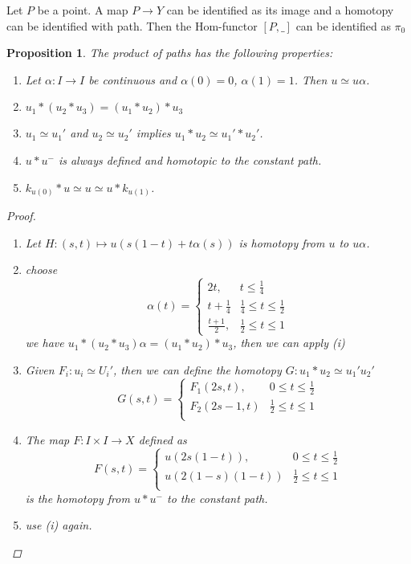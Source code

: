 \documentclass[11pt]{article}
\newtheorem{prop}[thm]{Proposition}
\newcommand{\lrta}{\longrightarrow}
\begin{document}
Let $P$ be a point. A map $P\lrta Y$ can be identified as its image and a homotopy can be identified with path. Then the Hom-functor $[P,\_]$ can be identified as $\pi_0$

\begin{prop}
The product of paths has the following properties:
\begin{enumerate}[label=(\roman*)]
\item Let $\alpha:I\lrta I$ be continuous and $\alpha(0)=0$, $\alpha(1)=1$. Then $u\simeq u\alpha$.
\item $u_1*(u_2*u_3)=(u_1*u_2)*u_3$
\item $u_1\simeq u_1'$ and $u_2\simeq u_2'$ implies $u_1*u_2\simeq u_1'*u_2'$.
\item $u*u^-$ is always defined and homotopic to the constant path.
\item $k_{u(0)}*u\simeq u\simeq u*k_{u(1)}$.
\end{enumerate}
\begin{proof}
\begin{enumerate}[label=(\roman*)]
\item Let $H:(s,t)\mapsto u(s(1-t)+t\alpha(s))$ is homotopy from $u$ to $u\alpha$.
\item choose 
$$
\alpha(t)=\left\{
\begin{matrix*}
2t, & t\leq \frac{1}{4}\\
t+\frac{1}{4} & \frac{1}{4}\leq t\leq \frac{1}{2}\\
\frac{t+1}{2}, & \frac{1}{2}\leq t\leq 1
\end{matrix*}
\right.
$$
we have $u_1*(u_2*u_3)\alpha=(u_1*u_2)*u_3$, then we can apply (i)
\item Given $F_i:u_i\simeq U_i'$, then we can define the homotopy $G:u_1*u_2\simeq u_1'u_2'$ 
$$
G(s,t)=\left\{
\begin{matrix*}
F_1(2s,t), & 0\leq t\leq \frac{1}{2}\\
F_2(2s-1,t) & \frac{1}{2}\leq t\leq 1\\
\end{matrix*}
\right.
$$
\item The map $F: I \times  I \lrta X$ defined as 
$$
F(s,t)=\left\{
\begin{matrix*}
u(2s(1-t)), & 0\leq t\leq \frac{1}{2}\\
u(2(1-s)(1-t)) & \frac{1}{2}\leq t\leq 1\\
\end{matrix*}
\right.
$$
is the homotopy from $u*u^-$ to the constant path.
\item use (i) again.
\end{enumerate}
\end{proof}
\end{prop}
\end{document}
